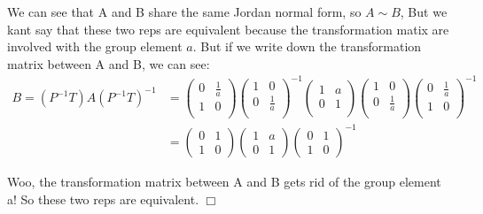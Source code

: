 \documentclass[]{ctexart}
\begin{document}
    We can see that A and B share the same Jordan normal form, so $A\sim B$, But we kant say that these two reps are equivalent because the transformation matix are involved with the group element $a$. But if we write down the transformation matrix between A and B, we can see:
    \begin{equation*}
    \begin{aligned}
    	B=(P^{-1}T)A(P^{-1}T)^{-1}&=
    	\left(
    	\begin{array}{cc}
    	0 & \frac{1}{a} \\
    	1 & 0 \\
    	\end{array}
    	\right)
    	\left(
    	\begin{array}{cc}
    	1 & 0 \\
    	0 & \frac{1}{a} \\
    	\end{array}
    	\right)^{-1}
    	\left(
    	\begin{array}{cc}
    	1 & a \\
    	0 & 1 \\
    	\end{array}
    	\right)
    	\left(
    	\begin{array}{cc}
    	1 & 0 \\
    	0 & \frac{1}{a} \\
    	\end{array}
    	\right)
    	\left(
    	\begin{array}{cc}
    	0 & \frac{1}{a} \\
    	1 & 0 \\
    	\end{array}
    	\right)^{-1}\\
    	&=\begin{pmatrix}
    	0 & 1\\
    	1 & 0
    	\end{pmatrix}
    	\begin{pmatrix}
    	1 & a\\
    	0 & 1
    	\end{pmatrix}
    	\begin{pmatrix}
    	0 & 1\\
    	1 & 0
    	\end{pmatrix}
    	^{-1}
    \end{aligned}
    \end{equation*}
    
    Woo, the transformation matrix between A and B gets rid of the group element a! So these two reps are equivalent. \qquad $\Box$
    
\end{document}
